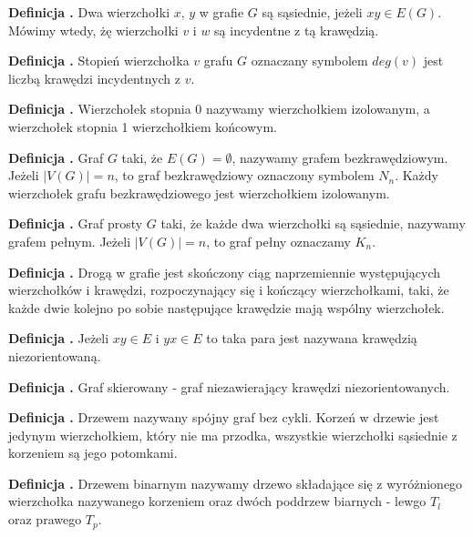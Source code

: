 \noindent
\textbf{Definicja \graphDefinitionIndex.}
\incrementGraphDefinitionIndex
Dwa wierzchołki $x$, $y$ w grafie $G$ są sąsiednie, jeżeli $xy \in E(G)$.
Mówimy wtedy, żę wierzchołki $v$ i $w$ są incydentne z tą krawędzią.

\noindent
\textbf{Definicja \graphDefinitionIndex.}
\incrementGraphDefinitionIndex
Stopień wierzchołka $v$ grafu $G$ oznaczany symbolem $deg(v)$ jest liczbą krawędzi incydentnych z $v$.

\noindent
\textbf{Definicja \graphDefinitionIndex.}
\incrementGraphDefinitionIndex
Wierzchołek stopnia 0 nazywamy wierzchołkiem izolowanym, a wierzchołek stopnia 1 wierzchołkiem końcowym.

\noindent
\textbf{Definicja \graphDefinitionIndex.}
\incrementGraphDefinitionIndex
Graf $G$ taki, że $E(G) = \emptyset$, nazywamy grafem bezkrawędziowym. Jeżeli $|V(G)| = n$, to graf bezkrawędziowy oznaczony symbolem $N_n$.
Każdy wierzchołek grafu bezkrawędziowego jest wierzchołkiem izolowanym.

\noindent
\textbf{Definicja \graphDefinitionIndex.}
\incrementGraphDefinitionIndex
Graf prosty $G$ taki, że każde dwa wierzchołki są sąsiednie, nazywamy grafem pełnym.
Jeżeli $|V(G)| = n$, to graf pełny oznaczamy $K_n$.

\noindent
\textbf{Definicja \graphDefinitionIndex.}
\incrementGraphDefinitionIndex
Drogą w grafie jest skończony ciąg naprzemiennie występujących wierzchołków i krawędzi, rozpoczynający się
i kończący wierzchołkami, taki, że każde dwie kolejno po sobie następujące krawędzie mają wspólny wierzchołek.

\noindent
\textbf{Definicja \graphDefinitionIndex.}
\incrementGraphDefinitionIndex
Jeżeli $xy \in E$ i $yx \in E$ to taka para jest nazywana krawędzią niezorientowaną.

\noindent
\textbf{Definicja \graphDefinitionIndex.}
\incrementGraphDefinitionIndex
Graf skierowany - graf niezawierający krawędzi niezorientowanych.

\noindent
\textbf{Definicja \graphDefinitionIndex.}
\incrementGraphDefinitionIndex
Drzewem nazywany spójny graf bez cykli. Korzeń w drzewie jest jedynym wierzchołkiem,
który nie ma przodka, wszystkie wierzchołki sąsiednie z korzeniem są jego potomkami.

\noindent
\textbf{Definicja \graphDefinitionIndex.}
\incrementGraphDefinitionIndex
Drzewem binarnym nazywamy drzewo składające się z wyróżnionego wierzchołka nazywanego korzeniem oraz dwóch poddrzew biarnych
- lewgo $T_l$ oraz prawego $T_p$.